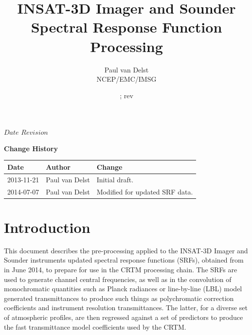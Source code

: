 



\SVN $Date$
\SVN $Revision$

\title{INSAT-3D Imager and Sounder Spectral Response Function Processing}
\author{Paul van Delst\\NCEP/EMC/IMSG}
\date{\SVNDate ; rev\SVNRevision}



\maketitle


\thispagestyle{empty}
\vspace*{10cm}
\begin{center}
  {\sffamily\Large\bfseries Change History}
  \begin{table}[htp]
    \centering
    \begin{tabular}{|p{2cm}|p{3cm}|p{8cm}|}
      \hline
      \sffamily\textbf{Date} & \sffamily\textbf{Author} & \sffamily\textbf{Change}\\
      \hline\hline
      2013-11-21 & Paul van Delst & Initial draft.\\
      \hline
      2014-07-07 & Paul van Delst & Modified for updated SRF data.\\
      \hline
    \end{tabular}
  \end{table}
\end{center}
\clearpage
\pagestyle{fancy}
\fancyhead[LE,RO]{\sffamily \rightmark}
\fancyhead[LO,RE]{\sffamily \leftmark}
\setcounter{page}{1}



\section{Introduction}
This document describes the pre-processing applied to the INSAT-3D Imager and Sounder instruments updated spectral response functions (SRFs), obtained from \cite{INSAT3D_SRF_Data2} in June 2014, to prepare for use in the CRTM processing chain. The SRFs are used to generate channel central frequencies, as well as in the convolution of monochromatic quantities such as Planck radiances or line-by-line (LBL) model generated transmittances to produce such things as polychromatic correction coefficients and instrument resolution transmittances. The latter, for a diverse set of atmospheric profiles, are then regressed against a set of predictors to produce the fast transmittance model coefficients used by the CRTM.

